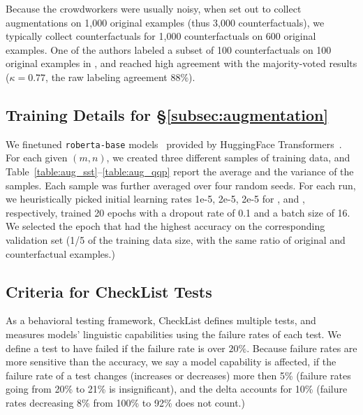 Because the crowdworkers were usually noisy, when set out to collect augmentations on 1,000 original examples (thus 3,000 counterfactuals), we typically collect counterfactuals for 1,000 counterfactuals on 600 original examples.
One of the authors labeled a subset of 100 counterfactuals on 100 original examples in \sst, and reached high agreement with the majority-voted results ($\kappa=0.77$, the raw labeling agreement $88\%$).


\subsection{Training Details for \S\ref{subsec:augmentation}}
\label{appendix:data_collection}

We finetuned \texttt{roberta-base} models~\cite{liu2019roberta} provided by HuggingFace Transformers~\cite{Wolf2019HuggingFacesTS}.
For each given $(m,n)$, we created three different samples of training data, and Table~\ref{table:aug_sst}--\ref{table:aug_qqp} report the average and the variance of the samples.
Each sample was further averaged over four random seeds.
For each run, we heuristically picked initial learning rates 1e-5, 2e-5, 2e-5 for \sst, \nli and \qqp, respectively, trained 20 epochs with a dropout rate of 0.1 and a batch size of 16. 
We selected the epoch that had the highest accuracy on the corresponding validation set (1/5 of the training data size, with the same ratio of original and counterfactual examples.)


\subsection{Criteria for CheckList Tests}
\label{appendix:checklist}
As a behavioral testing framework, CheckList defines multiple tests, and measures models' linguistic capabilities using the failure rates of each test.
We define a test to have failed if the failure rate is over $20\%$.
Because failure rates are more sensitive than the accuracy, we say a model capability is affected, if the failure rate of a test changes (increases or decreases) more then 5\% (\eg failure rates going from 20\% to 21\% is insignificant), and the delta accounts for 10\% (\eg failure rates decreasing 8\% from 100\% to 92\% does not count.)


